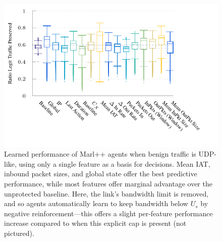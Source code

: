 \documentclass[conference, a4paper, 10pt, times]{IEEEtran}
\begin{document}
\begin{figure}
	\centering
	\includegraphics[width=\linewidth]{../plots/ftprep-box}
	\vspace{-1.2cm}
	\caption{
		Learned performance of Marl++ agents when benign traffic is UDP-like, using only a single feature as a basis for decisions.
		Mean IAT, inbound packet sizes, and global state offer the best predictive performance, while most features offer marginal advantage over the unprotected baseline.
		Here, the link's bandwidth limit is removed, and so agents automatically learn to keep bandwidth below $U_s$ by negative reinforcement---this offers a slight per-feature performance increase compared to when this explicit cap is present (not pictured).
		\label{fig:udp-feature-plots}
	}
\end{figure}
\end{document}
